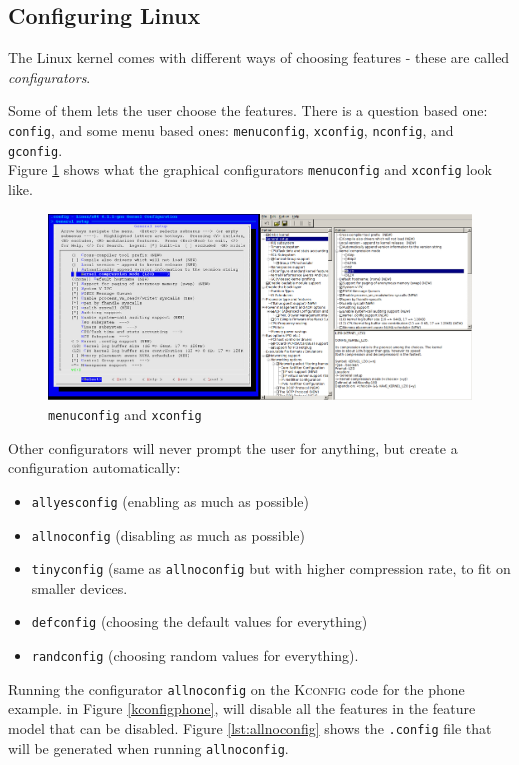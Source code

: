 \documentclass[a4paper,11pt]{report}
\newcommand{\figa}{
    \begin{figure}[!htpb]
    \centering
}
\newcommand{\figb}[2]{
    \caption{#1}
    \label{#2}
    \end{figure}
}
\begin{document}
            \subsection{Configuring Linux}
            \label{sec:conf}

The Linux kernel comes with different ways of choosing features - these are 
called \emph{configurators}. 

Some of them lets the user choose the features. There is a question based 
one: \texttt{config}, and some menu based ones: \texttt{menuconfig}, 
\texttt{xconfig}, \texttt{nconfig}, and \texttt{gconfig}.
\\

Figure \ref{fig:lineofconfigs} shows what the graphical 
configurators \texttt{menuconfig} and 
\texttt{xconfig} look like.
\\


\figa
    \includegraphics[scale=0.25]{pngs/2configs.png}
\figb{\texttt{menuconfig} and \texttt{xconfig}}{fig:lineofconfigs}

Other configurators will 
never prompt the user for anything, but create a configuration automatically: 
\begin{itemize}
    \item \texttt{allyesconfig} (enabling as much as possible) 
    \item \texttt{allnoconfig} (disabling as much as possible)
    \item \texttt{tinyconfig} (same as \texttt{allnoconfig} but with higher 
    compression rate, to fit on smaller devices.
    \item \texttt{defconfig} (choosing the default values for everything)
    \item \texttt{randconfig} (choosing random values for everything).
\end{itemize}



Running the configurator \texttt{allnoconfig} on the \textsc{Kconfig} code for 
the phone example. in Figure \ref{kconfigphone}, will disable all the features 
in the feature model that can be disabled. Figure \ref{lst:allnoconfig} shows 
the \texttt{.config} file that will be generated when running 
\texttt{allnoconfig}.
\\
\end{document}
